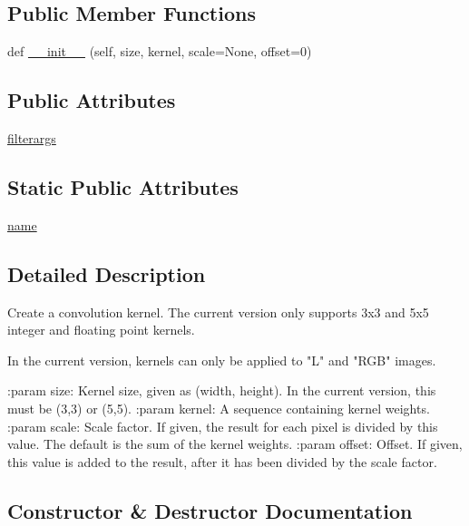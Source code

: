 \subsection*{Public Member Functions}
\begin{DoxyCompactItemize}
\item 
def \hyperlink{classPIL_1_1ImageFilter_1_1Kernel_a8a93b5c9ef6a7bde1ce628dc29654b35}{\+\_\+\+\_\+init\+\_\+\+\_\+} (self, size, kernel, scale=None, offset=0)
\end{DoxyCompactItemize}
\subsection*{Public Attributes}
\begin{DoxyCompactItemize}
\item 
\hyperlink{classPIL_1_1ImageFilter_1_1Kernel_a78ad87516bd9305e73e3cf29833d6798}{filterargs}
\end{DoxyCompactItemize}
\subsection*{Static Public Attributes}
\begin{DoxyCompactItemize}
\item 
\hyperlink{classPIL_1_1ImageFilter_1_1Kernel_a050f629ac6768fc467a138b307896991}{name}
\end{DoxyCompactItemize}


\subsection{Detailed Description}
\begin{DoxyVerb}Create a convolution kernel.  The current version only
supports 3x3 and 5x5 integer and floating point kernels.

In the current version, kernels can only be applied to
"L" and "RGB" images.

:param size: Kernel size, given as (width, height). In the current
                version, this must be (3,3) or (5,5).
:param kernel: A sequence containing kernel weights.
:param scale: Scale factor. If given, the result for each pixel is
                divided by this value.  The default is the sum of the
                kernel weights.
:param offset: Offset. If given, this value is added to the result,
                after it has been divided by the scale factor.
\end{DoxyVerb}
 

\subsection{Constructor \& Destructor Documentation}
\mbox{\label{classPIL_1_1ImageFilter_1_1Kernel_a8a93b5c9ef6a7bde1ce628dc29654b35}} 
